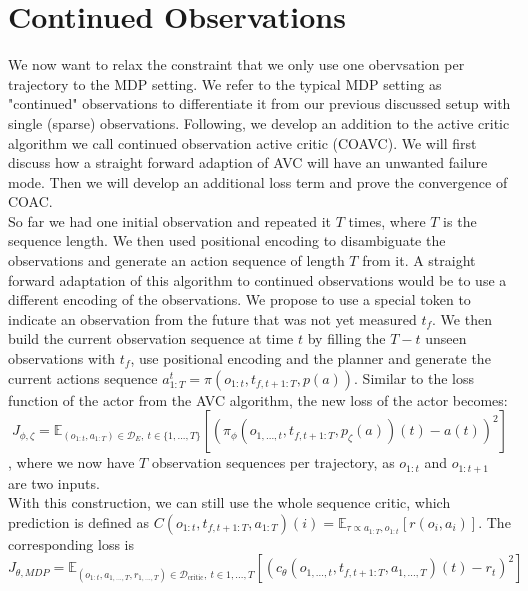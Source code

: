 \section{Continued Observations}
\label{sec:relax_dense}
We now want to relax the constraint that we only use one obervsation per trajectory to the MDP setting. 
We refer to the typical MDP setting as "continued" observations to differentiate it from our previous discussed setup with single (sparse) observations. 
Following, we develop an addition to the active critic algorithm we call continued observation active critic (COAVC). 
We will first discuss how a straight forward adaption of AVC will have an unwanted failure mode. Then we will develop an additional loss term and prove the convergence of COAC.\\

So far we had one initial observation and repeated it $T$ times, where $T$ is the sequence length. We then used positional encoding to disambiguate the observations and generate an action sequence of 
length $T$ from it. A straight forward adaptation of this algorithm to continued observations would be to use a different encoding of the observations. We propose to use a special token to indicate an 
observation from the future that was not yet measured $t_f$. We then build the current observation sequence at time $t$ by filling the $T - t$ unseen observations with $t_f$, use positional encoding and 
the planner and 
generate the current actions sequence $a^t_{1:T} = \pi(o_{1:t}, t_{f, t+1:T}, p(a))$. Similar to the loss function of the actor from the AVC algorithm, the new loss of the actor becomes: 
\begin{equation}
    \label{dense_actor_objective}
    J_{\phi, \zeta} = \mathbb{E}_{(o_{1:t}, a_{1:T}) \in \mathcal{D}_E,\ t \in \{1, ..., T\}}\left[\left( \pi_{\phi}(o_{1, ..., t}, t_{f, t+1:T}, p_{\zeta}(a))(t) - a(t)\right)^2\right]
\end{equation}
, where we now have $T$ observation sequences per trajectory, as $o_{1:t}$ and $o_{1:t+1}$ are two inputs.\\
With this construction, we can still use the whole sequence critic, 
which prediction is defined as $C(o_{1:t}, t_{f, t+1:T}, a_{1:T})(i) = \mathbb{E}_{\tau \propto a_{1:T}, o_{1:t}}\left[r(o_i, a_i)\right]$. The corresponding loss is
\begin{equation}
    \label{eq:dense_critic_loss}
    J_{\theta, MDP} = \mathbb{E}_{(o_{1:t}, a_{1,...,T}, r_{1,...,T}) \in \mathcal{D}_{\text{critic}},\ t \in {1, ..., T}}\left[(c_{\theta}(o_{1, ..., t}, t_{f, t+1:T},  a_{1,...,T})(t) - r_t)^2\right]
\end{equation}

